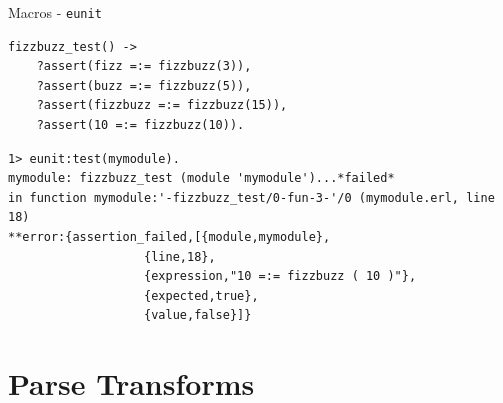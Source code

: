 \documentclass[c]{beamer}
\begin{document}
\begin{frame}[fragile]{Macros - \texttt{eunit}}
  \begin{lstlisting}
fizzbuzz_test() ->
    ?assert(fizz =:= fizzbuzz(3)),
    ?assert(buzz =:= fizzbuzz(5)),
    ?assert(fizzbuzz =:= fizzbuzz(15)),
    ?assert(10 =:= fizzbuzz(10)).
  \end{lstlisting}
\pause
  \begin{verbatim}
1> eunit:test(mymodule).
mymodule: fizzbuzz_test (module 'mymodule')...*failed*
in function mymodule:'-fizzbuzz_test/0-fun-3-'/0 (mymodule.erl, line 18)
**error:{assertion_failed,[{module,mymodule},
                   {line,18},
                   {expression,"10 =:= fizzbuzz ( 10 )"},
                   {expected,true},
                   {value,false}]}
  \end{verbatim}
\end{frame}


\section{Parse Transforms}
\end{document}
